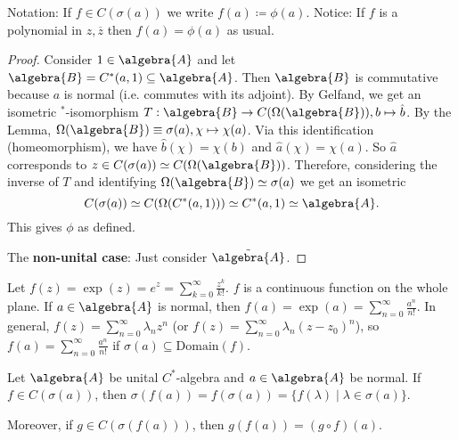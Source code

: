 \documentclass[a4paper]{article}
\begin{document}
Notation: If $f \in C(\sigma(a))$ we write $f(a) \coloneq \phi(a)$.
Notice: If $f$ is a polynomial in $z, \overline{z}$ then $f(a) = \phi(a)$ as usual.

\begin{proof}
	Consider $1 \in \algebra{A}$ and let $\algebra{B} = C^*(a,1) \subseteq \algebra{A}$. 
	Then $\algebra{B}$ is commutative because $a$ is normal (i.e. commutes with its adjoint).
	By Gelfand, we get an isometric $^*$-isomorphism $T: \algebra{B} \to C(\Omega(\algebra{B})), b \mapsto \hat{b}$.
	By the Lemma, $\Omega(\algebra{B}) \equiv \sigma(a), \chi \mapsto \chi(a)$.
	Via this identification (homeomorphism), we have $\hat{b}(\chi) = \chi(b)$ and $\hat{a}(\chi) = \chi(a)$.
	So $\hat{a}$ corresponds to $z \in C(\sigma(a)) \simeq C(\Omega(\algebra{B}))$.
	Therefore, considering the inverse of $T$ and identifying $\Omega(\algebra{B}) \simeq \sigma(a)$ we get an isometric 
	\begin{equation*}
		C(\sigma(a)) \simeq C(\Omega(C^*(a,1))) \simeq C^*(a,1) \simeq \algebra{A}\text{.}
	\end{equation*}
	This gives $\phi$ as defined.

	The \textbf{non-unital case}: Just consider $\tilde{\algebra{A}}$.
\end{proof}

\begin{example}
	Let $f(z) = \exp(z) = e^z = \sum_{k=0}^{\infty} \frac{z^k}{k!}$. $f$ is a continuous function on the whole plane.
	If $a \in \algebra{A}$ is normal, then $f(a) = \exp(a) = \sum_{n = 0}^{\infty} \frac{a^n}{n!}$.
	In general, $f(z) = \sum_{n = 0}^{\infty} \lambda_n z^n$ (or $f(z) = \sum_{n = 0}^{\infty} \lambda_n (z - z_0)^n$), so $f(a) = \sum_{n = 0}^{\infty} \frac{a^n}{n!}$ if $\sigma(a) \subseteq \mathrm{Domain}(f)$.
\end{example}

\begin{theorem}
	Let $\algebra{A}$ be unital $C^*$-algebra and $a \in \algebra{A}$ be normal.
	If $f \in C(\sigma(a))$, then $\sigma(f(a)) = f(\sigma(a)) = \{f(\lambda) \mid \lambda \in \sigma(a)\}$.

	Moreover, if $g \in C(\sigma(f(a)))$, then $g(f(a)) = (g \circ f)(a)$.
\end{theorem}
\end{document}
